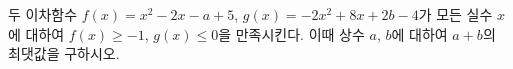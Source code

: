 두 이차함수 $f(x)=x^2-2x-a+5$, $g(x)=-2x^2+8x+2b-4$가 모든 실수 $x$에 대하여 $f(x)\ge -1$, $g(x)\le 0$을 만족시킨다. 이때 상수 $a$, $b$에 대하여 $a+b$의 최댓값을 구하시오.
